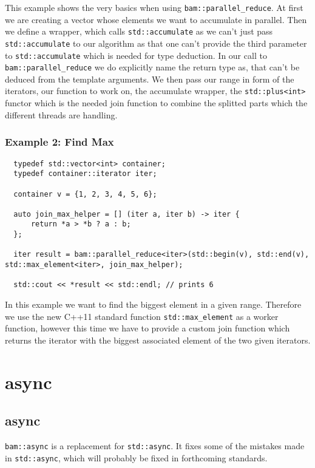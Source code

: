 \documentclass[11pt, a4paper]{article}
\begin{document}
This example shows the very basics when using \texttt{bam::parallel\_reduce}. At first we are creating a vector whose elements we want to accumulate in parallel. Then we define a wrapper, which calls \texttt{std::accumulate} as we can't just pass \texttt{std::accumulate} to our algorithm as that one can't provide the third parameter to \texttt{std::accumulate} which is needed for type deduction. In our call to \texttt{bam::parallel\_reduce} we do explicitly name the return type as, that can't be deduced from the template arguments. We then pass our range in form of the iterators, our function to work on, the accumulate wrapper, the \texttt{std::plus<int>} functor which is the needed join function to combine the splitted parts which the different threads are handling. 

\subsubsection{Example 2: Find Max}
\begin{lstlisting}
  typedef std::vector<int> container;
  typedef container::iterator iter;

  container v = {1, 2, 3, 4, 5, 6};

  auto join_max_helper = [] (iter a, iter b) -> iter {
      return *a > *b ? a : b;
  };

  iter result = bam::parallel_reduce<iter>(std::begin(v), std::end(v), std::max_element<iter>, join_max_helper);

  std::cout << *result << std::endl; // prints 6
\end{lstlisting}

In this example we want to find the biggest element in a given range. Therefore we use the new C++11 standard function \texttt{std::max\_element} as a worker function, however this time we have to provide a custom join function which returns the iterator with the biggest associated element of the two given iterators.

\section{async}
\subsection{async}
\texttt{bam::async} is a replacement for \texttt{std::async}. It fixes some of the mistakes made in \texttt{std::async}, which will probably be fixed in forthcoming standards. 
\end{document}
